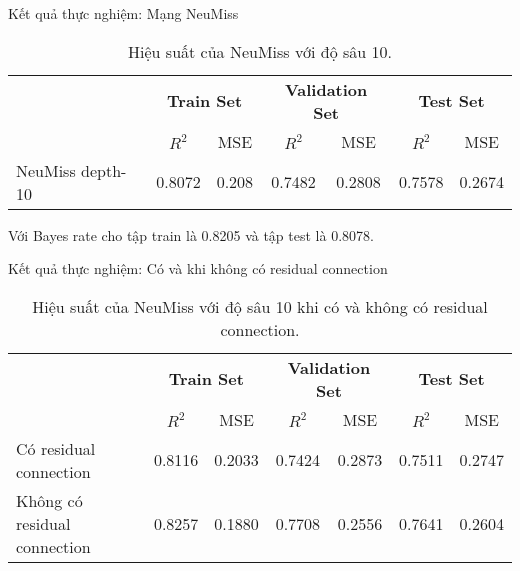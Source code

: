 \begin{frame}{Kết quả thực nghiệm: Mạng NeuMiss}

    \begin{table}[h!]
    \centering
    \setlength{\tabcolsep}{10pt}
    \begin{tabular}{lcccccc}
    \toprule
    & \multicolumn{2}{c}{\textbf{Train Set}} & \multicolumn{2}{c}{\textbf{Validation Set}} & \multicolumn{2}{c}{\textbf{Test Set}} \\
    \cmidrule(lr){2-3}\cmidrule(lr){4-5}\cmidrule(lr){6-7}
     & $R^2$ & MSE & $R^2$ & MSE & $R^2$ & MSE \\
    \midrule
    NeuMiss depth-10 & 0.8072 & 0.208 & 0.7482 & 0.2808 & 0.7578 & 0.2674 \\
    \bottomrule
    \end{tabular}
    \caption{Hiệu suất của NeuMiss với độ sâu 10.}
    \label{tab:performance}
    \end{table}
Với Bayes rate cho tập train là 0.8205 và tập test là 0.8078.
\end{frame}

\begin{frame}{Kết quả thực nghiệm: Có và khi không có residual connection}
    \begin{table}[h!]
    \centering
    \setlength{\tabcolsep}{7.3pt}
    \begin{tabular}{p{5.3cm}cccccc}
    \toprule
    & \multicolumn{2}{c}{\textbf{Train Set}} & \multicolumn{2}{c}{\textbf{Validation Set}} & \multicolumn{2}{c}{\textbf{Test Set}} \\
    \cmidrule(lr){2-3}\cmidrule(lr){4-5}\cmidrule(lr){6-7}
     & $R^2$ & MSE & $R^2$ & MSE & $R^2$ & MSE \\
    \midrule
    \raggedright Có residual connection & 0.8116 & 0.2033 & 0.7424 & 0.2873 & 0.7511 & 0.2747 \\
    \raggedright Không có residual connection & 0.8257 & 0.1880 & 0.7708 & 0.2556 & 0.7641 & 0.2604 \\
    \bottomrule
    \end{tabular}
    \caption{Hiệu suất của NeuMiss với độ sâu 10 khi có và không có residual connection.}
    \label{tab:performance_residual}
    \end{table}
\end{frame}

